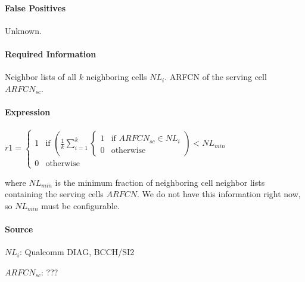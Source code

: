 \documentclass[a4paper,11pt,notitlepage,bigheadings,oneside]{scrartcl}
\begin{document}
\paragraph{False Positives}

Unknown.

\paragraph{Required Information}

Neighbor lists of all $k$ neighboring cells $NL_i$. ARFCN of the serving cell
$ARFCN_{sc}$.

\paragraph{Expression}

$r1 =
\begin{cases}
	1 & \text{if } \left(\frac{1}{k}\displaystyle\sum_{i=1}^{k}
                                \begin{cases}
	                                1 & \text{if } ARFCN_{sc} \in NL_i \\
	                                0 & \text{otherwise}
                                \end{cases}\right) < NL_{min} \\
        0 & \text{otherwise}
        \end{cases}
$

where $NL_{min}$ is the minimum fraction of neighboring cell neighbor lists
containing the serving cells $ARFCN$. We do not have this information right
now, so $NL_{min}$ must be configurable.

\paragraph{Source}

$NL_i$: Qualcomm DIAG, BCCH/SI2




$ARFCN_{sc}$: ???

\end{document}
